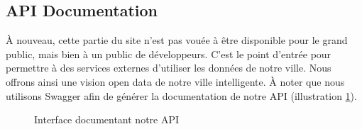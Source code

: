\subsection{API Documentation}
À nouveau, cette partie du site n’est pas vouée à être disponible pour le grand public, mais bien à un public de développeurs. C’est le point d’entrée pour permettre à des services externes d’utiliser les données de notre ville. Nous offrons ainsi une vision open data de notre ville intelligente. À noter que nous utilisons Swagger afin de générer la documentation de notre API (illustration \ref{doc}).
\begin{figure}[H]
    \begin{center}
        \caption{Interface documentant notre API}\label{doc}
    \end{center}
\end{figure}